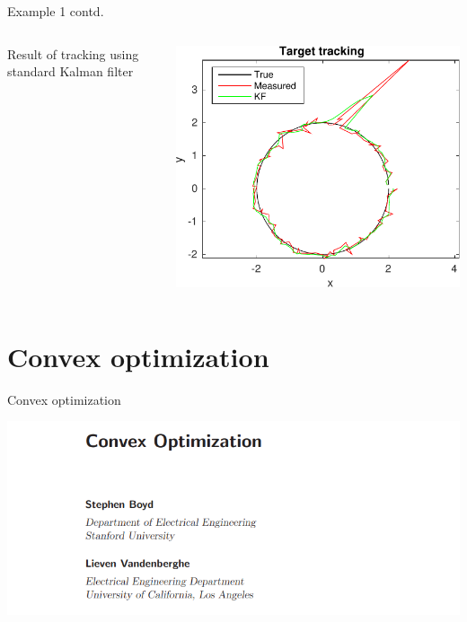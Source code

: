 \documentclass[presentation,aspectratio=169]{beamer}
\begin{document}
\begin{frame}[label=sec-1-5]{Example 1 contd.}
\begin{columns}
\begin{column}{0.3\textwidth}
Result of tracking using standard Kalman filter
\end{column}
\begin{column}{0.7\textwidth}
\begin{center}
\includegraphics[width=0.9\linewidth]{circular-movement-kf-crop}
\end{center}
\end{column}
\end{columns}
\end{frame}
\section{Convex optimization}
\label{sec-2}
\begin{frame}[label=sec-2-1]{Convex optimization}
\begin{center}
\includegraphics[width=0.7\linewidth]{cvx-book.png}
\end{center}
\end{frame}
\end{document}
